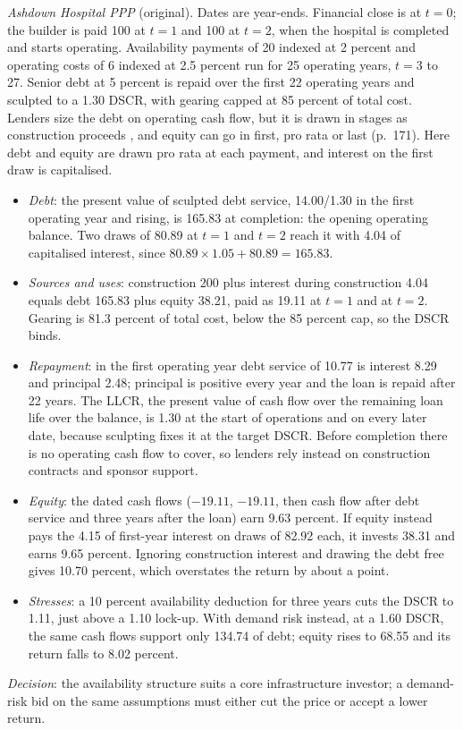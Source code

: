 \begin{qfmethod}
 \emph{Ashdown Hospital PPP} (original). Dates are year-ends. Financial close is at $t=0$; the builder is paid 100 at $t=1$ and 100 at $t=2$, when the hospital is completed and starts operating. Availability payments of 20 indexed at 2 percent and operating costs of 6 indexed at 2.5 percent run for 25 operating years, $t=3$ to 27. Senior debt at 5 percent is repaid over the first 22 operating years and sculpted to a 1.30 DSCR, with gearing capped at 85 percent of total cost. Lenders size the debt on operating cash flow, but it is drawn in stages as construction proceeds \citep[pp.~157--158]{larreur-structured-finance-2021}, and equity can go in first, pro rata or last (p.~171). Here debt and equity are drawn pro rata at each payment, and interest on the first draw is capitalised.
\begin{itemize}
\item \emph{Debt}: the present value of sculpted debt service, 14.00/1.30 in the first operating year and rising, is 165.83 at completion: the opening operating balance. Two draws of 80.89 at $t=1$ and $t=2$ reach it with 4.04 of capitalised interest, since $80.89\times1.05+80.89=165.83$.
\item \emph{Sources and uses}: construction 200 plus interest during construction 4.04 equals debt 165.83 plus equity 38.21, paid as 19.11 at $t=1$ and at $t=2$. Gearing is 81.3 percent of total cost, below the 85 percent cap, so the DSCR binds.
\item \emph{Repayment}: in the first operating year debt service of 10.77 is interest 8.29 and principal 2.48; principal is positive every year and the loan is repaid after 22 years. The LLCR, the present value of cash flow over the remaining loan life over the balance, is 1.30 at the start of operations and on every later date, because sculpting fixes it at the target DSCR. Before completion there is no operating cash flow to cover, so lenders rely instead on construction contracts and sponsor support.
\item \emph{Equity}: the dated cash flows ($-19.11$, $-19.11$, then cash flow after debt service and three years after the loan) earn 9.63 percent. If equity instead pays the 4.15 of first-year interest on draws of 82.92 each, it invests 38.31 and earns 9.65 percent. Ignoring construction interest and drawing the debt free gives 10.70 percent, which overstates the return by about a point.
\item \emph{Stresses}: a 10 percent availability deduction for three years cuts the DSCR to 1.11, just above a 1.10 lock-up. With demand risk instead, at a 1.60 DSCR, the same cash flows support only 134.74 of debt; equity rises to 68.55 and its return falls to 8.02 percent.
\end{itemize}
\emph{Decision}: the availability structure suits a core infrastructure investor; a demand-risk bid on the same assumptions must either cut the price or accept a lower return.


\end{qfmethod}
